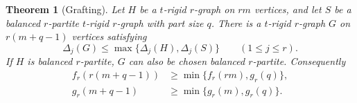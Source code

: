 \documentclass[10pt]{article}
\numberwithin{equation}{section}
\newtheorem{theorem}{Theorem}[section]
\begin{document}
\begin{theorem}[Grafting]\label{finite:thm:graft}
Let $H$ be a $t$-rigid $r$-graph on $rm$ vertices, and let $S$ be a
balanced $r$-partite $t$-rigid $r$-graph with part size $q$.
There is a $t$-rigid $r$-graph $G$ on $r(m+q-1)$ vertices satisfying
\begin{equation}\label{finite:eq:graft-degree}
 \Delta_j(G)\le\max\{\Delta_j(H),\Delta_j(S)\}
 \qquad(1\le j\le r).
\end{equation}
If $H$ is balanced $r$-partite, $G$ can also be chosen balanced
$r$-partite. Consequently
\begin{align}
 f_r(r(m+q-1))&\ge\min\{f_r(rm),g_r(q)\},\label{finite:eq:graft-f}\\
 g_r(m+q-1)&\ge\min\{g_r(m),g_r(q)\}.
 \label{finite:eq:graft-g}
\end{align}
\end{theorem}
\end{document}
